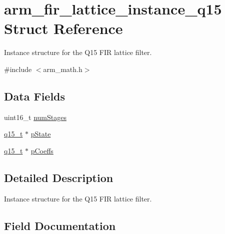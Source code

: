 \hypertarget{structarm__fir__lattice__instance__q15}{}\section{arm\+\_\+fir\+\_\+lattice\+\_\+instance\+\_\+q15 Struct Reference}
\label{structarm__fir__lattice__instance__q15}


Instance structure for the Q15 F\+IR lattice filter.  




{\ttfamily \#include $<$arm\+\_\+math.\+h$>$}

\subsection*{Data Fields}
\begin{DoxyCompactItemize}
\item 
uint16\+\_\+t \mbox{\hyperlink{structarm__fir__lattice__instance__q15_a4cceb90547b3e585d4c7aabaa8057212}{num\+Stages}}
\item 
\mbox{\hyperlink{arm__math_8h_ab5a8fb21a5b3b983d5f54f31614052ea}{q15\+\_\+t}} $\ast$ \mbox{\hyperlink{structarm__fir__lattice__instance__q15_ae29dfdb736374fcddaeaec4b7770170c}{p\+State}}
\item 
\mbox{\hyperlink{arm__math_8h_ab5a8fb21a5b3b983d5f54f31614052ea}{q15\+\_\+t}} $\ast$ \mbox{\hyperlink{structarm__fir__lattice__instance__q15_a7ca181a37f714d174445f486bebce26f}{p\+Coeffs}}
\end{DoxyCompactItemize}


\subsection{Detailed Description}
Instance structure for the Q15 F\+IR lattice filter. 

\subsection{Field Documentation}
\mbox{\label{structarm__fir__lattice__instance__q15_a4cceb90547b3e585d4c7aabaa8057212}} 
